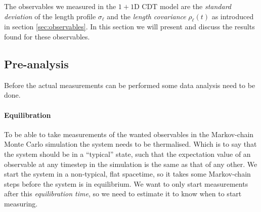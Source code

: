 The observables we measured in the $1 + 1$D CDT model are the \emph{standard deviation} of the length profile $\sigma_\ell$ and the \emph{length covariance} $\rho_\ell(t)$ as introduced in section \ref{sec:observables}.
In this section we will present and discuss the results found for these observables.

\subsection{Pre-analysis}
Before the actual measurements can be performed some data analysis need to be done.

\paragraph{Equilibration}
To be able to take measurements of the wanted observables in the Markov-chain Monte Carlo simulation the system needs to be thermalised. Which is to say that the system should be in a ``typical'' state, such that the expectation value of an observable at any timestep in the simulation is the same as that of any other.
We start the system in a non-typical, flat spacetime, so it takes some Markov-chain steps before the system is in equilibrium.
We want to only start measurements after this \emph{equilibration time}, so we need to estimate it to know when to start measuring.

